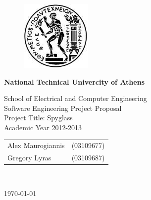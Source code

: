 \begin{titlepage}
\begin{center}
\begin{figure}[t] 
     \includegraphics[scale=0.7]{title/ntua_logo}
\end{figure}
\begin{LARGE}\textbf{National Technical Univercity of Athens\\}\end{LARGE}
\vspace{2cm}
\begin{Large}
School of Electrical and Computer Engineering\\
Software Engineering Project Proposal\\
Project Title: Spyglass\\
Academic Year 2012-2013\\
\end{Large}
\vspace{6cm}
\begin{tabular}{l r}
\Large{Alex Maurogiannis}&
\large{(03109677)}\\
\Large{Gregory Lyras}&
\large{(03109687)}\\
\end{tabular}\\
\vspace{5cm}

\vfill
\large\today\\
\end{center}
\end{titlepage}


